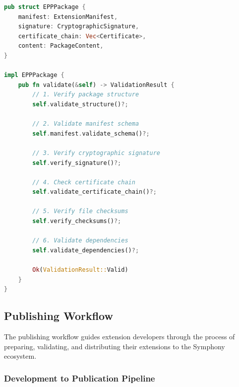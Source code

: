 \begin{lstlisting}[language=rust,caption=EPP Package Validation]
pub struct EPPPackage {
    manifest: ExtensionManifest,
    signature: CryptographicSignature,
    certificate_chain: Vec<Certificate>,
    content: PackageContent,
}

impl EPPPackage {
    pub fn validate(&self) -> ValidationResult {
        // 1. Verify package structure
        self.validate_structure()?;
        
        // 2. Validate manifest schema
        self.manifest.validate_schema()?;
        
        // 3. Verify cryptographic signature
        self.verify_signature()?;
        
        // 4. Check certificate chain
        self.validate_certificate_chain()?;
        
        // 5. Verify file checksums
        self.verify_checksums()?;
        
        // 6. Validate dependencies
        self.validate_dependencies()?;
        
        Ok(ValidationResult::Valid)
    }
}
\end{lstlisting}

\subsection{Publishing Workflow}
\label{subsec:publishing-workflow}

The publishing workflow guides extension developers through the process of preparing, validating, and distributing their extensions to the Symphony ecosystem.

\subsubsection{Development to Publication Pipeline}
\label{subsubsec:development-to-publication-pipeline}

